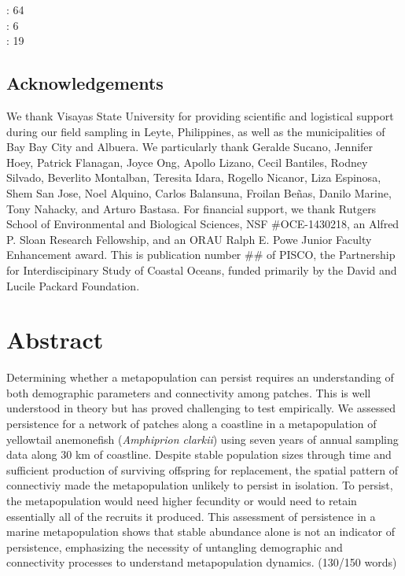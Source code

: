 \documentclass[12pt, oneside]{article}   	%
\begin{document}
: 64 \\ 

: 6 \\ 

: 19 \\ 

\subsection*{Acknowledgements}
We thank Visayas State University for providing scientific and logistical support during our field sampling in Leyte, Philippines, as well as the municipalities of Bay Bay City and Albuera. We particularly thank Geralde Sucano, Jennifer Hoey, Patrick Flanagan, Joyce Ong, Apollo Lizano, Cecil Bantiles, Rodney Silvado, Beverlito Montalban, Teresita Idara, Rogello Nicanor, Liza Espinosa, Shem San Jose, Noel Alquino, Carlos Balansuna, Froilan Beñas, Danilo Marine, Tony Nahacky, and Arturo Bastasa. For financial support, we thank Rutgers School of Environmental and Biological Sciences, NSF \#OCE-1430218, an Alfred P. Sloan Research Fellowship, and an ORAU Ralph E. Powe Junior Faculty Enhancement award. This is publication number \#\# of PISCO, the Partnership for Interdiscipinary Study of Coastal Oceans, funded primarily by the David and Lucile Packard Foundation.

\bigskip

\section*{Abstract}
Determining whether a metapopulation can persist requires an understanding of both demographic parameters and connectivity among patches. This is well understood in theory but has proved challenging to test empirically. We assessed persistence for a network of patches along a coastline in a metapopulation of yellowtail anemonefish (\textit{Amphiprion clarkii}) using seven years of annual sampling data along 30 km of coastline. Despite stable population sizes through time and sufficient production of surviving offspring for replacement, the spatial pattern of connectiviy made the metapopulation unlikely to persist in isolation. To persist, the metapopulation would need higher fecundity or would need to retain essentially all of the recruits it produced. This assessment of persistence in a marine metapopulation shows that stable abundance alone is not an indicator of persistence, emphasizing the necessity of untangling demographic and connectivity processes to understand metapopulation dynamics. (130/150 words) 
\end{document}
